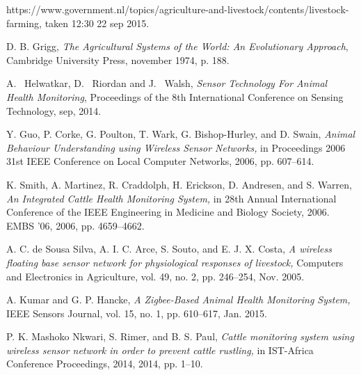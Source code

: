 \documentclass[conference]{IEEEtran}
\begin{document}
%
%
%
\begin{thebibliography}{1}

    https://www.government.nl/topics/agriculture-and-livestock/contents/livestock-farming,
    taken 12:30 22 sep 2015.

    D. B. Grigg, \emph{The Agricultural Systems of
    the World: An Evolutionary Approach}, Cambridge University Press, november
    1974, p. 188.

A. ~Helwatkar, D. ~Riordan and J. ~Walsh,
\emph{Sensor Technology For Animal Health Monitoring},
Proceedings of the 8th International Conference on Sensing Technology,
sep, 2014.

Y. Guo, P. Corke, G. Poulton, T. Wark, G. Bishop-Hurley, and D. Swain, \emph{Animal Behaviour Understanding using Wireless Sensor Networks,} in Proceedings 2006 31st IEEE Conference on Local Computer Networks, 2006, pp. 607–614.

K. Smith, A. Martinez, R. Craddolph, H. Erickson, D. Andresen, and S. Warren, \emph{An Integrated Cattle Health Monitoring System,} in 28th Annual International Conference of the IEEE Engineering in Medicine and Biology Society, 2006. EMBS ’06, 2006, pp. 4659–4662.

A. C. de Sousa Silva, A. I. C. Arce, S. Souto, and E. J. X. Costa, \emph{A wireless floating base sensor network for physiological responses of livestock,} Computers and Electronics in Agriculture, vol. 49, no. 2, pp. 246–254, Nov. 2005.

A. Kumar and G. P. Hancke, \emph{A Zigbee-Based Animal Health Monitoring System,} IEEE Sensors Journal, vol. 15, no. 1, pp. 610–617, Jan. 2015.

P. K. Mashoko Nkwari, S. Rimer, and B. S. Paul, \emph{Cattle monitoring system using wireless sensor network in order to prevent cattle rustling,} in IST-Africa Conference Proceedings, 2014, 2014, pp. 1–10.


\end{thebibliography}
\end{document}
